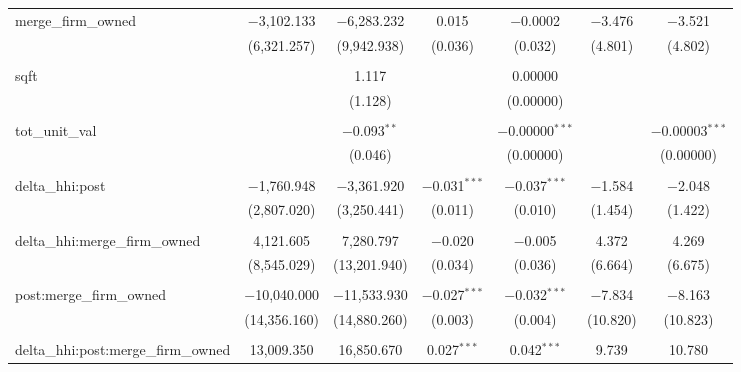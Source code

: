 \begin{table}[H]
{\begin{tabular}{@{\extracolsep{5pt}}lcccccc}
  merge\_firm\_owned & $-$3,102.133 & $-$6,283.232 & 0.015 & $-$0.0002 & $-$3.476 & $-$3.521 \\  

   & (6,321.257) & (9,942.938) & (0.036) & (0.032) & (4.801) & (4.802) \\  

   & & & & & & \\  

  sqft &  & 1.117 &  & 0.00000 &  &  \\  

   &  & (1.128) &  & (0.00000) &  &  \\  

   & & & & & & \\  

  tot\_unit\_val &  & $-$0.093$^{**}$ &  & $-$0.00000$^{***}$ &  & $-$0.00003$^{***}$ \\  

   &  & (0.046) &  & (0.00000) &  & (0.00000) \\  

   & & & & & & \\  

  delta\_hhi:post & $-$1,760.948 & $-$3,361.920 & $-$0.031$^{***}$ & $-$0.037$^{***}$ & $-$1.584 & $-$2.048 \\  

   & (2,807.020) & (3,250.441) & (0.011) & (0.010) & (1.454) & (1.422) \\  

   & & & & & & \\  

  delta\_hhi:merge\_firm\_owned & 4,121.605 & 7,280.797 & $-$0.020 & $-$0.005 & 4.372 & 4.269 \\  

   & (8,545.029) & (13,201.940) & (0.034) & (0.036) & (6.664) & (6.675) \\  

   & & & & & & \\  

  post:merge\_firm\_owned & $-$10,040.000 & $-$11,533.930 & $-$0.027$^{***}$ & $-$0.032$^{***}$ & $-$7.834 & $-$8.163 \\  

   & (14,356.160) & (14,880.260) & (0.003) & (0.004) & (10.820) & (10.823) \\  

   & & & & & & \\  

  delta\_hhi:post:merge\_firm\_owned & 13,009.350 & 16,850.670 & 0.027$^{***}$ & 0.042$^{***}$ & 9.739 & 10.780 \\  


\end{tabular}}
\end{table}
